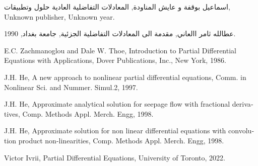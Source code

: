 \documentclass{arabicClass}
\begin{document}
	\renewcommand{\jot}{15pt}
	\abovedisplayskip=7pt
	\belowdisplayskip=7pt
	
	
	
	\tableofcontents
	
	


	
	
	
	
	
	
	



\begin{thebibliography}{9}
	
	اسماعيل بوقفة و عايش المناودة,
	المعادلات التفاضلية العادية حلول وتطبيقات,
	Unknown publisher, Unknown year.
	
	عطالله ثامر االعاني,
	مقدمة الى المعادلات التفاضلية الجزئية,
	جامعة بغداد, 1990.
	
\begin{english}
	E.C. Zachmanoglou and Dale W. Thoe,
	Introduction to Partial Differential Equations with Applications,
	Dover Publications, Inc., New York, 1986.
	
	J.H. He,
	A new approach to nonlinear partial differential equations,
	Comm. in Nonlinear Sci. and Nummer. Simul.2, 1997.
	
	J.H. He,
	Approximate analytical solution for seepage flow with fractional derivatives,
	Comp. Methods Appl. Merch. Engg, 1998.
	
	J.H. He,
	Approximate solution for non linear differential equations with convolution product non-linearities,
	Comp. Methods Appl. Merch. Engg, 1998.

Victor Ivrii,
Partial Differential Equations,
University of Toronto, 2022.
\end{english}
	
\end{thebibliography}
\end{document}
